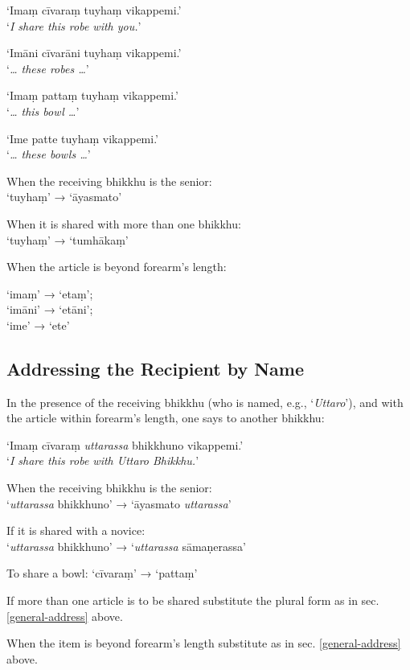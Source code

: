‘Imaṃ cīvaraṃ tuyhaṃ vikappemi.’\\
‘\emph{I share this robe with you.}’

‘Imāni cīvarāni tuyhaṃ vikappemi.’\\
‘\emph{\ldots{} these robes \ldots{}}’

‘Imaṃ pattaṃ tuyhaṃ vikappemi.’\\
‘\emph{\ldots{} this bowl \ldots{}}’

‘Ime patte tuyhaṃ vikappemi.’\\
‘\emph{\ldots{} these bowls \ldots{}}’

When the receiving bhikkhu is the senior:\\
‘tuyhaṃ’ → ‘āyasmato’

When it is shared with more than one bhikkhu:\\
‘tuyhaṃ’ → ‘tumhākaṃ’

When the article is beyond forearm's length:

‘imaṃ’ → ‘etaṃ’;\\
‘imāni’ → ‘etāni’;\\
‘ime’ → ‘ete’


\subsection{Addressing the Recipient by Name}

In the presence of the receiving bhikkhu (who is named, e.g., ‘\emph{Uttaro}’),
and with the article within forearm's length, one says to another bhikkhu:

‘Imaṃ cīvaraṃ \emph{uttarassa} bhikkhuno vikappemi.’\\
‘\emph{I share this robe with Uttaro Bhikkhu.}’

When the receiving bhikkhu is the senior:\\
‘\emph{uttarassa} bhikkhuno’ → ‘āyasmato \emph{uttarassa}’

If it is shared with a novice:\\
‘\emph{uttarassa} bhikkhuno’ → ‘\emph{uttarassa} sāmaṇerassa’

To share a bowl: ‘cīvaraṃ’ → ‘pattaṃ’

If more than one article is to be shared substitute the plural form as in sec. \ref{general-address} above.

When the item is beyond forearm's length substitute as in sec. \ref{general-address} above.


